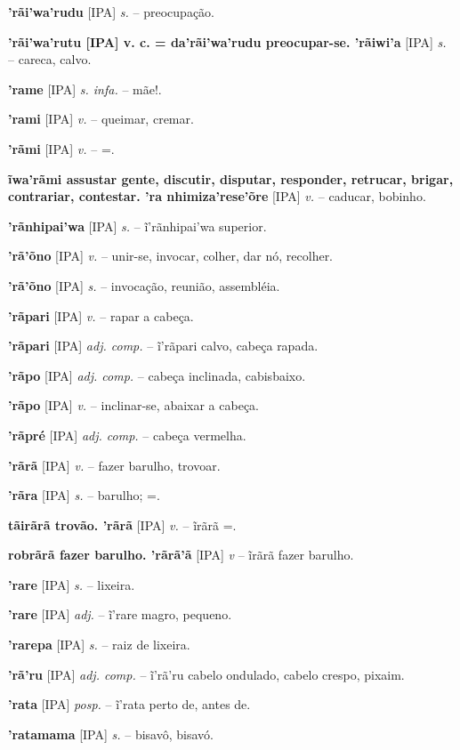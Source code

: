 \textbf{'rãi'wa'rudu} [IPA] \textit{s.} -- preocupação.

\textbf{'rãi'wa'rutu [IPA] v. c. = da'rãi'wa'rudu preocupar-se. 'rãiwi'a} [IPA] \textit{s.} -- careca, calvo.

\textbf{'rame} [IPA] \textit{s. infa.} -- mãe!.

\textbf{'rami} [IPA] \textit{v.} -- queimar, cremar.

\textbf{'rãmi} [IPA] \textit{v.} -- =.

\textbf{ĩwa'rãmi assustar gente, discutir, disputar, responder, retrucar, brigar, contrariar, contestar. 'ra nhimiza'rese'õre} [IPA] \textit{v.} -- caducar, bobinho.

\textbf{'rãnhipai'wa} [IPA] \textit{s.} -- ĩ'rãnhipai'wa superior.

\textbf{'rã'õno} [IPA] \textit{v.} -- unir-se, invocar, colher, dar nó, recolher.

\textbf{'rã'õno} [IPA] \textit{s.} -- invocação, reunião, assembléia.

\textbf{'rãpari} [IPA] \textit{v.} -- rapar a cabeça.

\textbf{'rãpari} [IPA] \textit{adj. comp.} -- ĩ'rãpari calvo, cabeça rapada.

\textbf{'rãpo} [IPA] \textit{adj. comp.} -- cabeça inclinada, cabisbaixo.

\textbf{'rãpo} [IPA] \textit{v.} -- inclinar-se, abaixar a cabeça.

\textbf{'rãpré} [IPA] \textit{adj. comp.} -- cabeça vermelha.

\textbf{'rãrã} [IPA] \textit{v.} -- fazer barulho, trovoar.

\textbf{'rãra} [IPA] \textit{s.} -- barulho; =.

\textbf{tãirãrã trovão. 'rãrã} [IPA] \textit{v.} -- ĩrãrã =.

\textbf{robrãrã fazer barulho. 'rãrã'ã} [IPA] \textit{v} -- ĩrãrã fazer barulho.

\textbf{'rare} [IPA] \textit{s.} -- lixeira.

\textbf{'rare} [IPA] \textit{adj.} -- ĩ'rare magro, pequeno.

\textbf{'rarepa} [IPA] \textit{s.} -- raiz de lixeira.

\textbf{'rã'ru} [IPA] \textit{adj. comp.} -- ĩ'rã'ru cabelo ondulado, cabelo crespo, pixaim.

\textbf{'rata} [IPA] \textit{posp.} -- ĩ'rata perto de, antes de.

\textbf{'ratamama} [IPA] \textit{s.} -- bisavô, bisavó.

